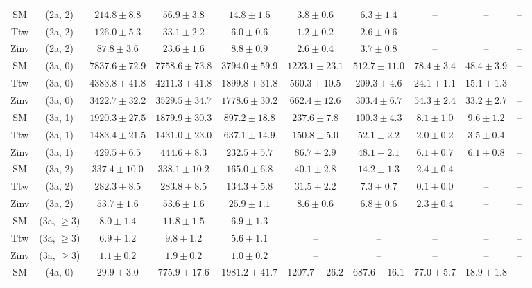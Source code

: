 \begin{table}[h!]
{\begin{tabular}{cccccccccc}
	SM & (2a, 2) & $214.8\pm 8.8$ & $56.9\pm 3.8$ & $14.8\pm 1.5$ & $3.8\pm 0.6$ & $6.3\pm 1.4$ & -- & -- & -- \\[0.5ex] 
	Ttw & (2a, 2) & $126.0\pm 5.3$ & $33.1\pm 2.2$ & $6.0\pm 0.6$ & $1.2\pm 0.2$ & $2.6\pm 0.6$ & -- & -- & -- \\[0.5ex] 
	Zinv & (2a, 2) & $87.8\pm 3.6$ & $23.6\pm 1.6$ & $8.8\pm 0.9$ & $2.6\pm 0.4$ & $3.7\pm 0.8$ & -- & -- & -- \\[0.5ex] 
	SM & (3a, 0) & $7837.6\pm 72.9$ & $7758.6\pm 73.8$ & $3794.0\pm 59.9$ & $1223.1\pm 23.1$ & $512.7\pm 11.0$ & $78.4\pm 3.4$ & $48.4\pm 3.9$ & -- \\[0.5ex] 
	Ttw & (3a, 0) & $4383.8\pm 41.8$ & $4211.3\pm 41.8$ & $1899.8\pm 31.8$ & $560.3\pm 10.5$ & $209.3\pm 4.6$ & $24.1\pm 1.1$ & $15.1\pm 1.3$ & -- \\[0.5ex] 
	Zinv & (3a, 0) & $3422.7\pm 32.2$ & $3529.5\pm 34.7$ & $1778.6\pm 30.2$ & $662.4\pm 12.6$ & $303.4\pm 6.7$ & $54.3\pm 2.4$ & $33.2\pm 2.7$ & -- \\[0.5ex] 
	SM & (3a, 1) & $1920.3\pm 27.5$ & $1879.9\pm 30.3$ & $897.2\pm 18.8$ & $237.6\pm 7.8$ & $100.3\pm 4.3$ & $8.1\pm 1.0$ & $9.6\pm 1.2$ & -- \\[0.5ex] 
	Ttw & (3a, 1) & $1483.4\pm 21.5$ & $1431.0\pm 23.0$ & $637.1\pm 14.9$ & $150.8\pm 5.0$ & $52.1\pm 2.2$ & $2.0\pm 0.2$ & $3.5\pm 0.4$ & -- \\[0.5ex] 
	Zinv & (3a, 1) & $429.5\pm 6.5$ & $444.6\pm 8.3$ & $232.5\pm 5.7$ & $86.7\pm 2.9$ & $48.1\pm 2.1$ & $6.1\pm 0.7$ & $6.1\pm 0.8$ & -- \\[0.5ex] 
	SM & (3a, 2) & $337.4\pm 10.0$ & $338.1\pm 10.2$ & $165.0\pm 6.8$ & $40.1\pm 2.8$ & $14.2\pm 1.3$ & $2.4\pm 0.4$ & -- & -- \\[0.5ex] 
	Ttw & (3a, 2) & $282.3\pm 8.5$ & $283.8\pm 8.5$ & $134.3\pm 5.8$ & $31.5\pm 2.2$ & $7.3\pm 0.7$ & $0.1\pm 0.0$ & -- & -- \\[0.5ex] 
	Zinv & (3a, 2) & $53.7\pm 1.6$ & $53.6\pm 1.6$ & $25.9\pm 1.1$ & $8.6\pm 0.6$ & $6.8\pm 0.6$ & $2.3\pm 0.4$ & -- & -- \\[0.5ex] 
	SM & (3a, $\ge3$) & $8.0\pm 1.4$ & $11.8\pm 1.5$ & $6.9\pm 1.3$ & -- & -- & -- & -- & -- \\[0.5ex] 
	Ttw & (3a, $\ge3$) & $6.9\pm 1.2$ & $9.8\pm 1.2$ & $5.6\pm 1.1$ & -- & -- & -- & -- & -- \\[0.5ex] 
	Zinv & (3a, $\ge3$) & $1.1\pm 0.2$ & $1.9\pm 0.2$ & $1.0\pm 0.2$ & -- & -- & -- & -- & -- \\[0.5ex] 
	SM & (4a, 0) & $29.9\pm 3.0$ & $775.9\pm 17.6$ & $1981.2\pm 41.7$ & $1207.7\pm 26.2$ & $687.6\pm 16.1$ & $77.0\pm 5.7$ & $18.9\pm 1.8$ & -- \\[0.5ex] 

\end{tabular}}
\end{table}
